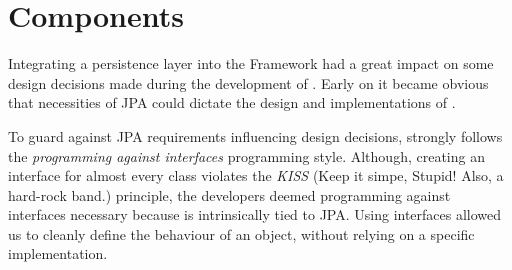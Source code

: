 \newpage
\chapter{\salespoint{} Components}
\label{chap:components}
Integrating a persistence layer into the \salespoint{} Framework had a great impact on some design decisions made during the development of \salespoint{}.
Early on it became obvious that necessities of JPA could dictate the design and implementations of \salespoint{}.

To guard against JPA requirements influencing design decisions, \salespoint{} strongly follows the \textit{programming against interfaces} programming style.
Although, creating an interface for almost every class violates the \textit{KISS} (Keep it simpe, Stupid! Also, a hard-rock band.) principle, the developers deemed programming against interfaces necessary because \salespoint{} is intrinsically tied to JPA.
Using interfaces allowed us to cleanly define the behaviour of an object, without relying on a specific implementation.
\\

